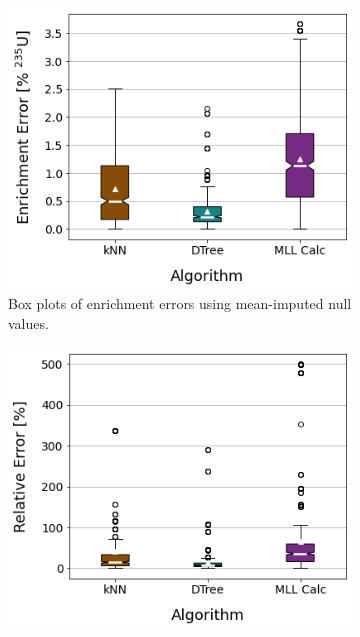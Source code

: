 \begin{figure}[!htb]
  \centering
  \begin{subfigure}[b]{0.49\textwidth}
    \centering
    \includegraphics[width=\textwidth]{./chapters/exp1/sfcompo_boxplots_impnull_enri.png}
    \caption{Box plots of enrichment errors using mean-imputed null values.}
    \label{fig:enriimp}
  \end{subfigure}
  \hfill
  \begin{subfigure}[b]{0.49\textwidth}
    \centering
    \includegraphics[width=\textwidth]{./chapters/exp1/sfcompo_boxplots_impnull_pcterr_enri.png}

\end{subfigure}
\end{figure}
